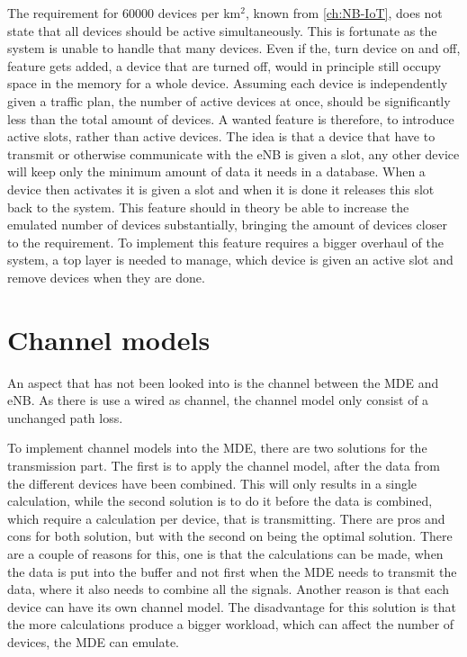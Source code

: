 The requirement for 60000 devices per km$^2$, known from \autoref{ch:NB-IoT}, does not state that all devices should be active simultaneously. This is fortunate as the system is unable to handle that many devices. Even if the, turn device on and off, feature gets added, a device that are turned off, would in principle still occupy space in the memory for a whole device. Assuming each device is independently given a traffic plan, the number of active devices at once, should be significantly less than the total amount of devices. A wanted feature is therefore, to introduce active slots, rather than active devices. The idea is that a device that have to transmit or otherwise communicate with the eNB is given a slot, any other device will keep only the minimum amount of data it needs in a database. When a device then activates it is given a slot and when it is done it releases this slot back to the system. This feature should in theory be able to increase the emulated number of devices substantially, bringing the amount of devices closer to the requirement. To implement this feature requires a bigger overhaul of the system, a top layer is needed to manage, which device is given an active slot and remove devices when they are done.



\section{Channel models}
An aspect that has not been looked into is the channel between the MDE and eNB. As there is use a wired as channel, the channel model only consist of a unchanged path loss. 

To implement channel models into the MDE, there are two solutions for the transmission part. The first is to apply the channel model, after the data from the different devices have been combined. This will only results in a single calculation, while the second solution is to do it before the data is combined, which require a calculation per device, that is transmitting. There are pros and cons for both solution, but with the second on being the optimal solution. There are a couple of reasons for this, one is that the calculations can be made, when the data is put into the buffer and not first when the MDE needs to transmit the data, where it also needs to combine all the signals. Another reason is that each device can have its own channel model. The disadvantage for this solution is that the more calculations produce a bigger workload, which can affect the number of devices, the MDE can emulate.


